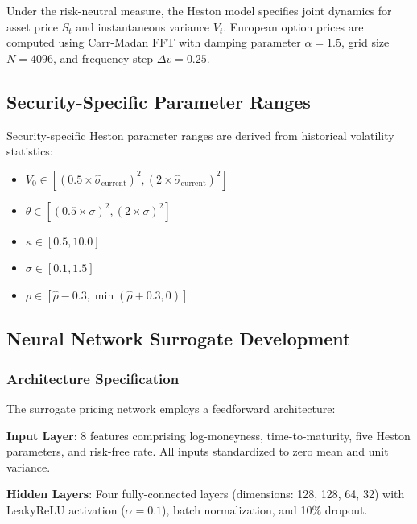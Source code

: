 \documentclass[12pt,a4paper]{article}
\begin{document}
Under the risk-neutral measure, the Heston model specifies joint dynamics for asset price $S_t$ and instantaneous variance $V_t$. European option prices are computed using Carr-Madan FFT with damping parameter $\alpha = 1.5$, grid size $N = 4096$, and frequency step $\Delta v = 0.25$.

\subsection{Security-Specific Parameter Ranges}

Security-specific Heston parameter ranges are derived from historical volatility statistics:

\begin{itemize}[noitemsep]

\item $V_0 \in [(0.5 \times \hat{\sigma}_{\text{current}})^2, (2 \times \hat{\sigma}_{\text{current}})^2]$

\item $\theta \in [(0.5 \times \bar{\sigma})^2, (2 \times \bar{\sigma})^2]$

\item $\kappa \in [0.5, 10.0]$

\item $\sigma \in [0.1, 1.5]$

\item $\rho \in [\hat{\rho} - 0.3, \min(\hat{\rho} + 0.3, 0)]$

\end{itemize}

\subsection{Neural Network Surrogate Development}

\subsubsection{Architecture Specification}

The surrogate pricing network employs a feedforward architecture:

\textbf{Input Layer}: 8 features comprising log-moneyness, time-to-maturity, five Heston parameters, and risk-free rate. All inputs standardized to zero mean and unit variance.

\textbf{Hidden Layers}: Four fully-connected layers (dimensions: 128, 128, 64, 32) with LeakyReLU activation ($\alpha=0.1$), batch normalization, and 10\% dropout.
\end{document}
